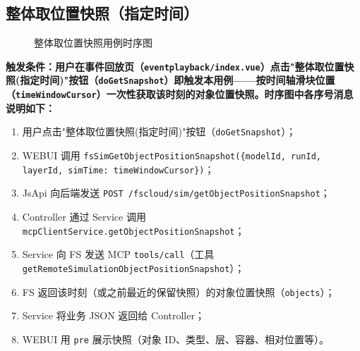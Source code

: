 \subsection{整体取位置快照（指定时间）}\label{sec:getSnapshot}
\begin{figure}[!h]
	\centering
	\resizebox{1.0\linewidth}{!}{}
	\caption{整体取位置快照用例时序图}\label{fig:getSnapshot}
\end{figure}
\bf{触发条件}：用户在事件回放页（\texttt{eventplayback/index.vue}）点击"整体取位置快照(指定时间)"按钮（\texttt{doGetSnapshot}）即触发本用例——按时间轴滑块位置（\texttt{timeWindowCursor}）一次性获取该时刻的对象位置快照。时序图中各序号消息说明如下：
\begin{enumerate}[label=\arabic*)]
	\item 用户点击"整体取位置快照(指定时间)"按钮（\texttt{doGetSnapshot}）；
	\item WEBUI 调用 \texttt{fsSimGetObjectPositionSnapshot(\{modelId, runId, layerId, simTime: timeWindowCursor\})}；
	\item JsApi 向后端发送 \texttt{POST /fscloud/sim/getObjectPositionSnapshot}；
	\item Controller 通过 Service 调用 \texttt{mcpClientService.getObjectPositionSnapshot}；
	\item Service 向 FS 发送 MCP \texttt{tools/call}（工具 \texttt{getRemoteSimulationObjectPositionSnapshot}）；
	\item FS 返回该时刻（或之前最近的保留快照）的对象位置快照（\texttt{objects}）；
	\item Service 将业务 JSON 返回给 Controller；
	\item WEBUI 用 \texttt{pre} 展示快照（对象 ID、类型、层、容器、相对位置等）。
\end{enumerate}
\newpage

